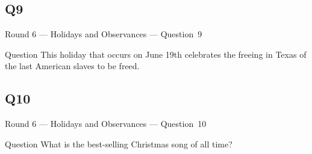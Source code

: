 \documentclass[11pt]{beamer}
\begin{document}
\subsection*{Q9}
\begin{frame}[t]{Round 6 --- Holidays and Observances --- \mbox{Question 9}}
\begin{block}{Question}
This holiday that occurs on June 19th celebrates the freeing in Texas of the last American slaves to be freed.
\end{block}
\end{frame}
\subsection*{Q10}
\begin{frame}[t]{Round 6 --- Holidays and Observances --- \mbox{Question 10}}
\begin{block}{Question}
What is the best-selling Christmas song of all time?
\end{block}
\end{frame}
\end{document}
